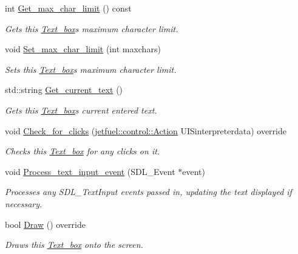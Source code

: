 \begin{DoxyCompactItemize}
int \hyperlink{classjetfuel_1_1gui_1_1Text__box_a5faccdac5b50830ac7425fcd3a0312a8}{Get\+\_\+max\+\_\+char\+\_\+limit} () const
\begin{DoxyCompactList}\small\item\em Gets this \hyperlink{classjetfuel_1_1gui_1_1Text__box}{Text\+\_\+box}\textquotesingle{}s maximum character limit. \end{DoxyCompactList}\item 
void \hyperlink{classjetfuel_1_1gui_1_1Text__box_a818042653f8a73a40060d978d1a1dbd8}{Set\+\_\+max\+\_\+char\+\_\+limit} (int maxchars)
\begin{DoxyCompactList}\small\item\em Sets this \hyperlink{classjetfuel_1_1gui_1_1Text__box}{Text\+\_\+box}\textquotesingle{}s maximum character limit. \end{DoxyCompactList}\item 
std\+::string \hyperlink{classjetfuel_1_1gui_1_1Text__box_ac68da2c696932b9ac32fb8f463239079}{Get\+\_\+current\+\_\+text} ()
\begin{DoxyCompactList}\small\item\em Gets this \hyperlink{classjetfuel_1_1gui_1_1Text__box}{Text\+\_\+box}\textquotesingle{}s current entered text. \end{DoxyCompactList}\item 
void \hyperlink{classjetfuel_1_1gui_1_1Text__box_a088d62b01be4747ea2e7a6218516e036}{Check\+\_\+for\+\_\+clicks} (\hyperlink{structjetfuel_1_1control_1_1Action}{jetfuel\+::control\+::\+Action} U\+I\+Sinterpreterdata) override
\begin{DoxyCompactList}\small\item\em Checks this \hyperlink{classjetfuel_1_1gui_1_1Text__box}{Text\+\_\+box} for any clicks on it. \end{DoxyCompactList}\item 
void \hyperlink{classjetfuel_1_1gui_1_1Text__box_a4671dbf122880e20bdc8953c4ea8a045}{Process\+\_\+text\+\_\+input\+\_\+event} (S\+D\+L\+\_\+\+Event $\ast$event)
\begin{DoxyCompactList}\small\item\em Processes any S\+D\+L\+\_\+\+Text\+Input events passed in, updating the text displayed if necessary. \end{DoxyCompactList}\item 
bool \hyperlink{classjetfuel_1_1gui_1_1Text__box_add6b8b170d66e4f6ee3c5878906bd2d1}{Draw} () override
\begin{DoxyCompactList}\small\item\em Draws this \hyperlink{classjetfuel_1_1gui_1_1Text__box}{Text\+\_\+box} onto the screen. \end{DoxyCompactList}\end{DoxyCompactItemize}
